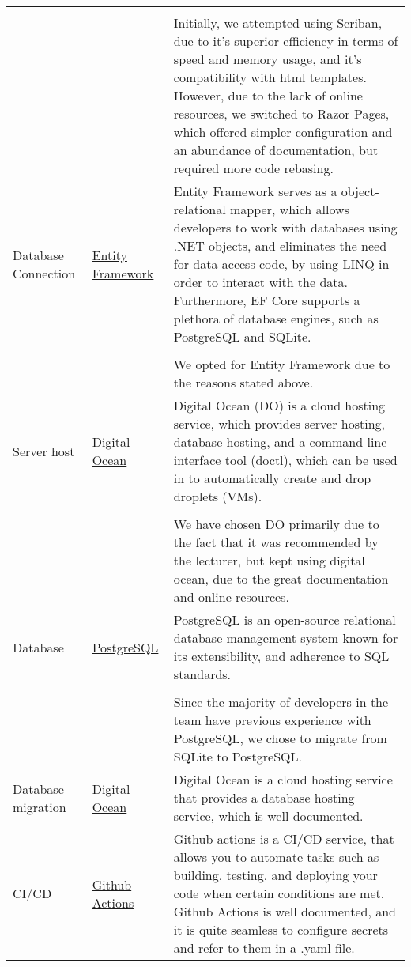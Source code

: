 \begin{longtable}{|p{}|p{} | p{}|}
    && \\
    && Initially, we attempted using Scriban, due to it's superior efficiency in terms of speed and memory usage, and it's compatibility with html templates. However, due to the lack of online resources, we switched to Razor Pages, which offered simpler configuration and an abundance of documentation, but required more code rebasing.\\
    \hline
    Database Connection & \href{https://learn.microsoft.com/en-us/ef/core/}{Entity Framework} & Entity Framework serves as a object-relational mapper, which allows developers to work with databases using .NET objects, and eliminates the need for data-access code, by using LINQ in order to interact with the data. Furthermore, EF Core supports a plethora of database engines, such as PostgreSQL and SQLite.\\
    &&\\
    && We opted for Entity Framework due to the reasons stated above.\\
    \hline
    Server host & \href{https://docs.digitalocean.com/}{Digital Ocean} & Digital Ocean (DO) is a cloud hosting service, which provides server hosting, database hosting, and a command line interface tool (doctl), which can be used in to automatically create and drop droplets (VMs).\\
    &&\\
    && We have chosen DO primarily due to the fact that it was recommended by the lecturer, but kept using digital ocean, due to the great documentation and online resources.\\
    \hline
    Database & \href{https://www.postgresql.org/docs/}{PostgreSQL} & PostgreSQL is an open-source relational database management system known for its extensibility, and adherence to SQL standards.\\
    &&\\
    && Since the majority of developers in the team have previous experience with PostgreSQL, we chose to migrate from SQLite to PostgreSQL.\\
    \hline
    Database migration & \href{https://www.digitalocean.com/products/managed-databases}{Digital Ocean} & Digital Ocean is a cloud hosting service that provides a database hosting service, which is well documented.\\ %
    \hline
    CI/CD & \href{https://docs.github.com/en/actions}{Github Actions} & Github actions is a CI/CD service, that allows you to automate tasks such as building, testing, and deploying your code when certain conditions are met. Github Actions is well documented, and it is quite seamless to configure secrets and refer to them in a .yaml file.\\

\end{longtable}
